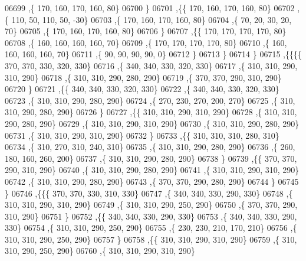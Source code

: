 \begin{DoxyCode}
06699     ,\{   170,   160,   170,   160,    80\}
06700     \}
06701    ,\{\{   170,   160,   170,   160,    80\}
06702     ,\{   110,    50,   110,    50,   -30\}
06703     ,\{   170,   160,   170,   160,    80\}
06704     ,\{    70,    20,    30,    20,    70\}
06705     ,\{   170,   160,   170,   160,    80\}
06706     \}
06707    ,\{\{   170,   170,   170,   170,    80\}
06708     ,\{   160,   160,   160,   160,    70\}
06709     ,\{   170,   170,   170,   170,    80\}
06710     ,\{   160,   160,   160,   160,    70\}
06711     ,\{    90,    90,    90,    90,     0\}
06712     \}
06713    \}
06714   \}
06715  ,\{\{\{\{   370,   370,   330,   320,   330\}
06716     ,\{   340,   340,   330,   320,   330\}
06717     ,\{   310,   310,   290,   310,   290\}
06718     ,\{   310,   310,   290,   280,   290\}
06719     ,\{   370,   370,   290,   310,   290\}
06720     \}
06721    ,\{\{   340,   340,   330,   320,   330\}
06722     ,\{   340,   340,   330,   320,   330\}
06723     ,\{   310,   310,   290,   280,   290\}
06724     ,\{   270,   230,   270,   200,   270\}
06725     ,\{   310,   310,   290,   280,   290\}
06726     \}
06727    ,\{\{   310,   310,   290,   310,   290\}
06728     ,\{   310,   310,   290,   280,   290\}
06729     ,\{   310,   310,   290,   310,   290\}
06730     ,\{   310,   310,   290,   280,   290\}
06731     ,\{   310,   310,   290,   310,   290\}
06732     \}
06733    ,\{\{   310,   310,   310,   280,   310\}
06734     ,\{   310,   270,   310,   240,   310\}
06735     ,\{   310,   310,   290,   280,   290\}
06736     ,\{   260,   180,   160,   260,   200\}
06737     ,\{   310,   310,   290,   280,   290\}
06738     \}
06739    ,\{\{   370,   370,   290,   310,   290\}
06740     ,\{   310,   310,   290,   280,   290\}
06741     ,\{   310,   310,   290,   310,   290\}
06742     ,\{   310,   310,   290,   280,   290\}
06743     ,\{   370,   370,   290,   280,   290\}
06744     \}
06745    \}
06746   ,\{\{\{   370,   370,   330,   310,   330\}
06747     ,\{   340,   340,   330,   290,   330\}
06748     ,\{   310,   310,   290,   310,   290\}
06749     ,\{   310,   310,   290,   250,   290\}
06750     ,\{   370,   370,   290,   310,   290\}
06751     \}
06752    ,\{\{   340,   340,   330,   290,   330\}
06753     ,\{   340,   340,   330,   290,   330\}
06754     ,\{   310,   310,   290,   250,   290\}
06755     ,\{   230,   230,   210,   170,   210\}
06756     ,\{   310,   310,   290,   250,   290\}
06757     \}
06758    ,\{\{   310,   310,   290,   310,   290\}
06759     ,\{   310,   310,   290,   250,   290\}
06760     ,\{   310,   310,   290,   310,   290\}

\end{DoxyCode}
